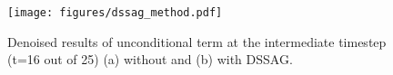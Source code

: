 \begin{figure}
    \centering
    \texttt{[image: figures/dssag\_method.pdf]}
    \vspace{-6mm}
    \caption{
    Denoised results of unconditional term at the intermediate timestep (t=16 out of 25) (a) without and (b) with DSSAG.}
    \vspace{-4mm}
    \label{fig:DSSAG}
\end{figure}
